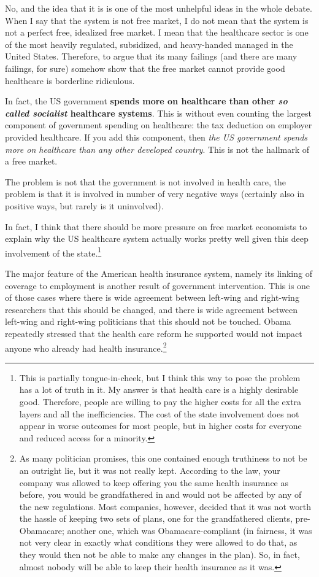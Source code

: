 No, and the idea that it is is one of the most unhelpful ideas in the whole
debate. When I say that the system is not free market, I do not mean that the
system is not a perfect free, idealized free market. I mean that the healthcare
sector is one of the most heavily regulated, subsidized, and heavy-handed
managed in the United States. Therefore, to argue that its many failings (and
there are many failings, for sure) somehow show that the free market cannot
provide good healthcare is borderline ridiculous.

In fact, the US government \textbf{spends more on healthcare than other
\emph{so called socialist} healthcare systems}. This is without even counting
the largest component of government spending on healthcare: the tax deduction
on employer provided healthcare. If you add this component, then \emph{the US
government spends more on healthcare than any other developed country}. This is
not the hallmark of a free market. %

The problem is not that the government is not involved in health care, the
problem is that it is involved in number of very negative ways (certainly also
in positive ways, but rarely is it uninvolved).

In fact, I think that there should be more pressure on free market economists
to explain why the US healthcare system actually works pretty well given this
deep involvement of the state.\footnote{This is partially tongue-in-cheek, but
I think this way to pose the problem has a lot of truth in it. My answer is
that health care is a highly desirable good. Therefore, people are willing to
pay the higher costs for all the extra layers and all the inefficiencies. The
cost of the state involvement does not appear in worse outcomes for most
people, but in higher costs for everyone and reduced access for a minority.}

The major feature of the American health insurance system, namely its linking
of coverage to employment is another result of government intervention. This is
one of those cases where there is wide agreement between left-wing and
right-wing researchers that this should be changed, and there is wide agreement
between left-wing and right-wing politicians that this should not be touched.
Obama repeatedly stressed that the health care reform he supported would not
impact anyone who already had health insurance.\footnote{As many politician
promises, this one contained enough truthiness to not be an outright lie, but
it was not really kept. According to the law, your company was allowed to keep
offering you the same health insurance as before, you would be grandfathered in
and would not be affected by any of the new regulations. Most companies,
however, decided that it was not worth the hassle of keeping two sets of plans,
one for the grandfathered clients, pre-Obamacare; another one,
which was Obamacare-compliant (in fairness, it was not very clear in exactly
what conditions they were allowed to do that, as they would then not be able to
make any changes in the plan). So, in fact, almost nobody will be able to keep
their health insurance as it was.}

